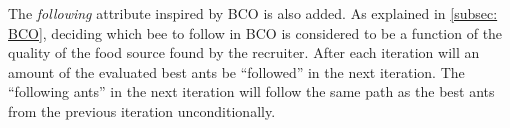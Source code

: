 The \textit{following} attribute inspired by BCO is also added. As explained in \vref{subsec: BCO}, deciding which bee to follow in BCO is considered to be a function of the quality of the food source found by the recruiter. After each iteration will an amount of the evaluated best ants be ``followed'' in the next iteration. The ``following ants'' in the next iteration will follow the same path as the best ants from the previous iteration unconditionally. 





